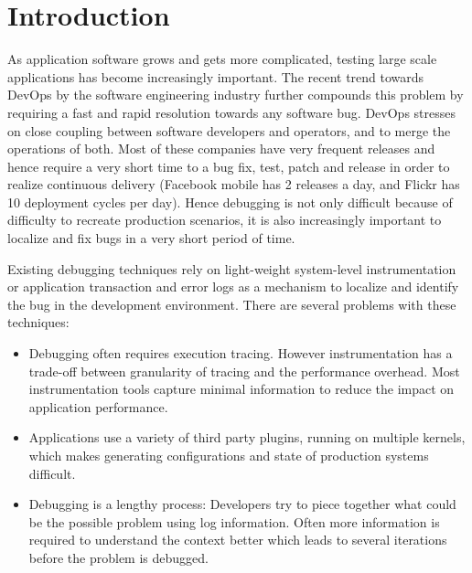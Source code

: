 
\section{Introduction}
\label{sec:intro}

As application software grows and gets more complicated, testing large scale applications has become increasingly important. 
The recent trend towards DevOps\cite{devops} by the software engineering industry further compounds this problem by requiring a fast and rapid resolution towards any software bug.
DevOps stresses on close coupling between software developers and operators, and to merge the operations of both. 
Most of these companies have very frequent releases and hence require a very short time to a bug fix, test, patch and release in order to realize continuous delivery (Facebook mobile has 2 releases a day, and Flickr has 10 deployment cycles per day).
Hence debugging is not only difficult because of difficulty to recreate production scenarios, it is also increasingly important to localize and fix bugs in a very short period of time.

Existing debugging techniques\cite{clue,magpie,vPath} rely on light-weight system-level instrumentation or application transaction and error logs as a mechanism to localize and identify the bug in the development environment.
There are several problems with these techniques:
\begin{itemize}[leftmargin=*,topsep=0pt,itemsep=-1ex,partopsep=1ex,parsep=1ex]
\item Debugging often requires execution tracing. However instrumentation has a trade-off between granularity of tracing and the performance overhead. Most instrumentation tools capture minimal information to reduce the impact on application performance.
\item Applications use a variety of third party plugins, running on 
multiple kernels, which makes generating configurations and state of production systems difficult. 
\item Debugging is a lengthy process: Developers try to piece together what could be the possible problem using log information.
Often more information is required to understand the context better which leads to several iterations before the problem is debugged.
\end{itemize}

